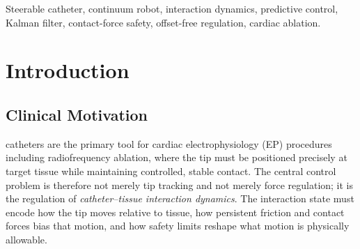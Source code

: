 \begin{abstract}
Steerable catheter control couples planned tip motion, compliance against moving tissue, friction rejection, and force limitation. We formulate catheter--tissue interaction dynamics in the scalar tip-normal coordinate of a single-segment single-tendon catheter. Partial-physics feedforward cancels the characterized nominal bending dynamics, exposing a linear interaction model whose input gain varies with the scalar catheter inertia. From this model we derive a finite-horizon quadratic program with disturbance centering and corrective-force constraints. The current MuJoCo validation evaluates its static impedance specialization with integral residual compensation, tendon saturation, and a pointwise corrective-force limit; a separate reduced-model OSQP test verifies the corresponding horizon box constraint. On an eight-link tendon-driven catheter, integral compensation reduces free-space approach error from 0.28 to 0.03\,mm. Against a penetrating target, the unrestricted controller reaches 0.60\,N, whereas the force-limited variant preserves the same approach accuracy with a measured 0.47\,N peak under a configured 0.5\,N engineering threshold. The measured peak remains 0.47\,N under the tested $0.5$\,mm, $1.2$\,Hz wall motion. These simulation results isolate the interaction between offset-free motion regulation and force limiting and define the next step toward an online horizon implementation and integrated-platform validation.
\end{abstract}

\begin{IEEEkeywords}
Steerable catheter, continuum robot, interaction dynamics, predictive control, Kalman filter, contact-force safety, offset-free regulation, cardiac ablation.
\end{IEEEkeywords}

\section{Introduction}

\subsection{Clinical Motivation}

 catheters are the primary tool for cardiac electrophysiology (EP) procedures including radiofrequency ablation, 
where the tip must be positioned precisely at target tissue while maintaining controlled, stable contact. The central control problem is 
therefore not merely tip tracking and not merely force regulation; it is the regulation of \emph{catheter--tissue interaction dynamics}. 
The interaction state must encode how the tip moves relative to tissue, how persistent friction and contact forces bias that motion, and 
how safety limits reshape what motion is physically allowable.

